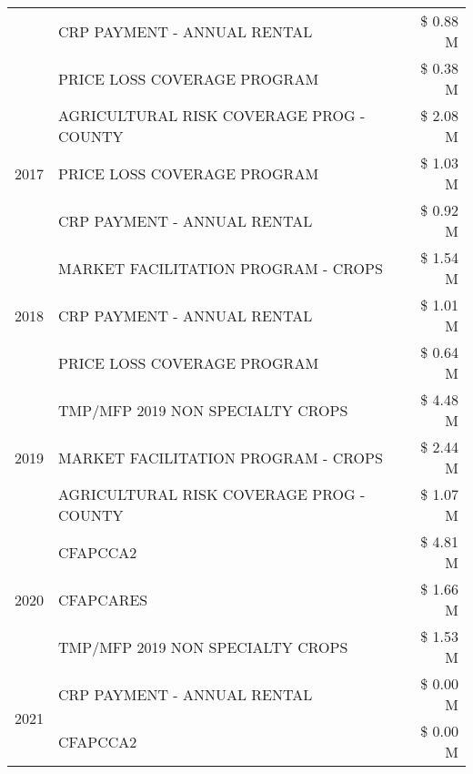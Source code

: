 \begin{tabular}{llr}
 & CRP PAYMENT - ANNUAL RENTAL & \$ 0.88 M \\
 & PRICE LOSS COVERAGE PROGRAM & \$ 0.38 M \\
\cline{1-3}
\multirow[t]{3}{*}{2017} & AGRICULTURAL RISK COVERAGE PROG - COUNTY & \$ 2.08 M \\
 & PRICE LOSS COVERAGE PROGRAM & \$ 1.03 M \\
 & CRP PAYMENT - ANNUAL RENTAL & \$ 0.92 M \\
\cline{1-3}
\multirow[t]{3}{*}{2018} & MARKET FACILITATION PROGRAM - CROPS & \$ 1.54 M \\
 & CRP PAYMENT - ANNUAL RENTAL & \$ 1.01 M \\
 & PRICE LOSS COVERAGE PROGRAM & \$ 0.64 M \\
\cline{1-3}
\multirow[t]{3}{*}{2019} & TMP/MFP 2019 NON SPECIALTY CROPS & \$ 4.48 M \\
 & MARKET FACILITATION PROGRAM - CROPS & \$ 2.44 M \\
 & AGRICULTURAL RISK COVERAGE PROG - COUNTY & \$ 1.07 M \\
\cline{1-3}
\multirow[t]{3}{*}{2020} & CFAPCCA2 & \$ 4.81 M \\
 & CFAPCARES & \$ 1.66 M \\
 & TMP/MFP 2019 NON SPECIALTY CROPS & \$ 1.53 M \\
\cline{1-3}
\multirow[t]{2}{*}{2021} & CRP PAYMENT - ANNUAL RENTAL & \$ 0.00 M \\
 & CFAPCCA2 & \$ 0.00 M \\
\cline{1-3}
\bottomrule
\end{tabular}
